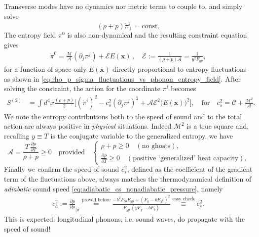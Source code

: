 Transverse modes have no dynamics nor metric terms to couple to, and simply solve
\begin{equation}
    (\bar{\rho}+\bar{p})\dot{\pi}_\perp^j=\text{const}.
\end{equation}
The entropy field $\pi^0$ is also non-dynamical and the resulting constraint equation gives
\begin{align}\label{eq:integrate_out_entropy_flat_spacetime}
    \dot{\pi}^0 = \frac{\mathcal{M}}{\mathcal{A}} (\partial_j \pi^j) +  \mathcal{E}{E(\mathbf{x})}\,,\quad \mathcal{E}:=\frac{1}{(\rho+p)\mathcal{A}} =\frac{1}{y^2F_{yy}},
\end{align}
for a function of space only $E(\mathbf{x})$ directly proportional to entropy fluctuations as shown in \eqref{eq:rho_p_sigma_fluctuations_vs_phonon_entropy_field}.
After solving the constraint, the action for the coordinate $\pi^i$ becomes
{\small
\begin{align}
    S^{(2)}&= \int d^4x \frac{(\rho+p)}{2}\Big[(\dot{\pi}^i)^2 - c_s^2 (\partial_j\pi^j)^2 +\mathcal{A}\mathcal{E}^2\big(E(\mathbf{x})\big)^2\Big], \quad \text{for}\quad c_s^2 = \mathcal{C} + \frac{\mathcal{M}^2}{\mathcal{A}}.
\end{align}
}
We note the entropy contributions both to the speed of sound and to the total action are always positive in \emph{physical} situations.
Indeed $\mathcal{M}^2$ is a true square and, recalling $y\equiv T$ is the conjugate variable to the generalized entropy, we have
\begin{equation}\label{eq:entropy_contribution_always_positive}
    \mathcal{A}= \frac{T\, \frac{\partial\rho }{\partial T}}{\rho+p}\geq 0 \quad\text{provided}\quad
    \begin{cases}
        \rho+p\geq 0 \quad(\text{no ghosts}),\\
        \frac{\partial\rho }{\partial T} \geq 0 \quad(\text{positive `generalized' heat capacity}).
    \end{cases} 
\end{equation}
Finally we confirm the speed of sound $c_s^2$, defined as the coefficient of the gradient term of the fluctuations above, always matches the thermodynamical definition of \emph{adiabatic} sound speed \eqref{eq:adiabatic_cs_nonadiabatic_pressure}, namely
\begin{align}\label{eq:cs_equiv_ca_flat_spacetime}
    c_a^2:= \frac{\partial p}{\partial \rho}_{\mid \sigma} \overset{\text{proved before}}{=}\frac{-b^2F_{bb} F_{yy}+(F_y-bF_{yb})^2}{F_{yy}\,(yF_y-bF_b)} \overset{\text{easy check}}{\equiv} c_s^2.
\end{align}
This is expected: longitudinal phonons, i.e. sound waves, do propagate with the speed of sound!




